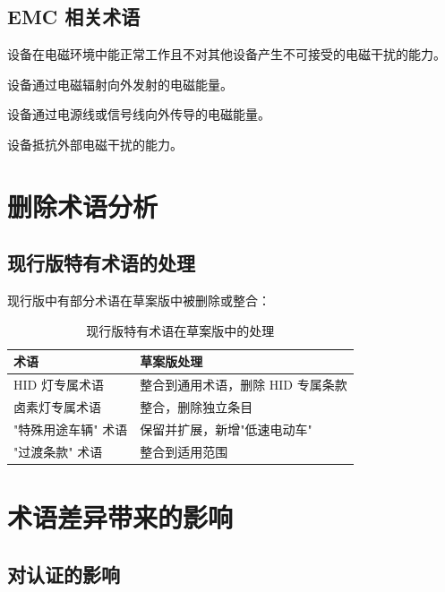 \subsection{EMC 相关术语}

\begin{description}[leftmargin=2em, style=nextline]
    \item[电磁兼容性（EMC）] 设备在电磁环境中能正常工作且不对其他设备产生不可接受的电磁干扰的能力。
    \item[辐射发射] 设备通过电磁辐射向外发射的电磁能量。
    \item[传导发射] 设备通过电源线或信号线向外传导的电磁能量。
    \item[抗扰度] 设备抵抗外部电磁干扰的能力。
\end{description}

\section{删除术语分析}

\subsection{现行版特有术语的处理}

现行版中有部分术语在草案版中被删除或整合：

\begin{table}[H]
\centering
\caption{现行版特有术语在草案版中的处理}
\begin{tabular}{|l|l|}
\hline
\textbf{术语} & \textbf{草案版处理} \\
\hline
HID 灯专属术语     & 整合到通用术语，删除 HID 专属条款 \\
\hline
卤素灯专属术语     & 整合，删除独立条目 \\
\hline
"特殊用途车辆" 术语  & 保留并扩展，新增"低速电动车" \\
\hline
"过渡条款" 术语     & 整合到适用范围 \\
\hline
\end{tabular}
\end{table}

\section{术语差异带来的影响}

\subsection{对认证的影响}

